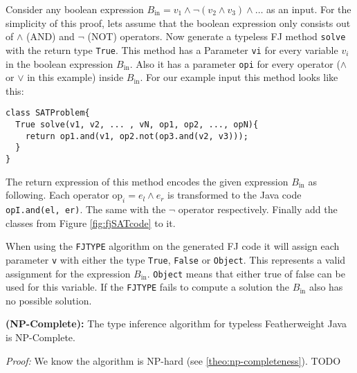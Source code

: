 Consider any boolean expression $B_\text{in} = v_1 \land \neg (v_2 \land v_3) \land \ldots$ as an input.
For the simplicity of this proof,
lets assume that the boolean expression only consists out of $\land$ (AND) and $\neg$ (NOT) operators.
Now generate a typeless FJ method \texttt{solve} with the return type \texttt{True}.
This method has a Parameter \texttt{vi} for every variable $v_i$ in the boolean expression $B_\text{in}$.
Also it has a parameter \texttt{opi} for every operator ($\land$ or $\lor$ in this example) inside $B_\text{in}$.
For our example input this method looks like this:
\begin{lstlisting}
class SATProblem{
  True solve(v1, v2, ... , vN, op1, op2, ..., opN){
    return op1.and(v1, op2.not(op3.and(v2, v3)));
  }
}
\end{lstlisting}
The return expression of this method encodes the given expression $B_\text{in}$ as following.
Each operator $\text{op}_i = e_l \land e_r$ is transformed to the Java code
\texttt{opI.and(el, er)}.
The same with the $\neg$ operator respectively.
Finally add the classes from Figure \ref{fig:fjSATcode} to it.

When using the \texttt{FJTYPE} algorithm on the generated FJ code it will
assign each parameter \texttt{v} with either the type \texttt{True}, \texttt{False}
or \texttt{Object}.
This represents a valid assignment for the expression $B_\text{in}$.
\texttt{Object} means that either true of false can be used for this variable.
If the \texttt{FJTYPE} fails to compute a solution the $B_\text{in}$ also has no possible solution.


\begin{theoremAndi}
  \label{theo:np-completeness}
  \textbf{(NP-Complete):}
  The type inference algorithm for typeless Featherweight Java is NP-Complete.
\end{theoremAndi}

\textit{Proof:} We know the algorithm is NP-hard (see \ref{theo:np-completeness}).
TODO
